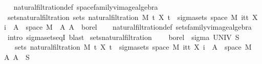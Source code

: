 \begin{isabellebody}
\isadelimproof
\ %
\endisadelimproof
%
\isatagproof
{}\isamarkupfalse%
\ natural{\isacharunderscore}{\kern0pt}filtration{\isacharunderscore}{\kern0pt}def\ space{\isacharunderscore}{\kern0pt}family{\isacharunderscore}{\kern0pt}vimage{\isacharunderscore}{\kern0pt}algebra\ \isacommand{{\isachardot}{\kern0pt}{\isachardot}{\kern0pt}}\isamarkupfalse%
%
\endisatagproof
{\isafoldproof}%
%
\isadelimproof
%
\endisadelimproof
\isanewline
\isanewline
{}\isamarkupfalse%
\ sets{\isacharunderscore}{\kern0pt}natural{\isacharunderscore}{\kern0pt}filtration{\isacharcolon}{\kern0pt}\ {\isachardoublequoteopen}sets\ {\isacharparenleft}{\kern0pt}natural{\isacharunderscore}{\kern0pt}filtration\ M\ t\ X\ t{\isacharparenright}{\kern0pt}\ {\isacharequal}{\kern0pt}\ sigma{\isacharunderscore}{\kern0pt}sets\ {\isacharparenleft}{\kern0pt}space\ M{\isacharparenright}{\kern0pt}\ {\isacharparenleft}{\kern0pt}{\isasymUnion}i{\isasymin}{\isacharbraceleft}{\kern0pt}tt{\isacharbraceright}{\kern0pt}{\isachardot}{\kern0pt}\ {\isacharbraceleft}{\kern0pt}X\ i\ {\isacharminus}{\kern0pt}{\isacharbackquote}{\kern0pt}\ A\ {\isasyminter}\ space\ M\ {\isacharbar}{\kern0pt}\ A{\isachardot}{\kern0pt}\ A\ {\isasymin}\ borel{\isacharbraceright}{\kern0pt}{\isacharparenright}{\kern0pt}{\isachardoublequoteclose}\isanewline
%
\isadelimproof
\ \ %
\endisadelimproof
%
\isatagproof
{}\isamarkupfalse%
\ natural{\isacharunderscore}{\kern0pt}filtration{\isacharunderscore}{\kern0pt}def\ sets{\isacharunderscore}{\kern0pt}family{\isacharunderscore}{\kern0pt}vimage{\isacharunderscore}{\kern0pt}algebra\ \isamarkupfalse%
\ {\isacharparenleft}{\kern0pt}intro\ sigma{\isacharunderscore}{\kern0pt}sets{\isacharunderscore}{\kern0pt}eqI{\isacharparenright}{\kern0pt}\ blast{\isacharplus}{\kern0pt}%
\endisatagproof
{\isafoldproof}%
%
\isadelimproof
\isanewline
%
\endisadelimproof
\isanewline
{}\isamarkupfalse%
\ sets{\isacharunderscore}{\kern0pt}natural{\isacharunderscore}{\kern0pt}filtration{\isacharprime}{\kern0pt}{\isacharcolon}{\kern0pt}\ \isanewline
\ \ \ {\isachardoublequoteopen}borel\ {\isacharequal}{\kern0pt}\ sigma\ UNIV\ S{\isachardoublequoteclose}\isanewline
\ \ \ {\isachardoublequoteopen}sets\ {\isacharparenleft}{\kern0pt}natural{\isacharunderscore}{\kern0pt}filtration\ M\ t\ X\ t{\isacharparenright}{\kern0pt}\ {\isacharequal}{\kern0pt}\ sigma{\isacharunderscore}{\kern0pt}sets\ {\isacharparenleft}{\kern0pt}space\ M{\isacharparenright}{\kern0pt}\ {\isacharparenleft}{\kern0pt}{\isasymUnion}i{\isasymin}{\isacharbraceleft}{\kern0pt}tt{\isacharbraceright}{\kern0pt}{\isachardot}{\kern0pt}\ {\isacharbraceleft}{\kern0pt}X\ i\ {\isacharminus}{\kern0pt}{\isacharbackquote}{\kern0pt}\ A\ {\isasyminter}\ space\ M\ {\isacharbar}{\kern0pt}\ A{\isachardot}{\kern0pt}\ A\ {\isasymin}\ S{\isacharbraceright}{\kern0pt}{\isacharparenright}{\kern0pt}{\isachardoublequoteclose}\isanewline

\end{isabellebody}
